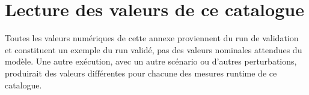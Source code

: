 
\section{Lecture des valeurs de ce catalogue}

Toutes les valeurs numériques de cette annexe proviennent du run de validation et constituent un exemple du run validé, pas des valeurs nominales attendues du modèle. Une autre exécution, avec un autre scénario ou d'autres perturbations, produirait des valeurs différentes pour chacune des mesures runtime de ce catalogue.
